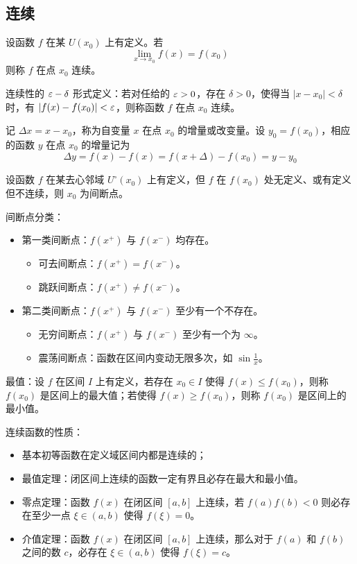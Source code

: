 \subsection{连续}

\begin{definition}[连续性]
	设函数 $f$ 在某 $U(x_0)$ 上有定义。若
	\[ \lim_{x\to x_0}f(x) = f(x_0) \]
	则称 $f$ 在点 $x_0$ 连续。

	连续性的 $\varepsilon-\delta$ 形式定义：若对任给的 $\varepsilon>0$，存在 $\delta>0$，使得当 $|x-x_0|<\delta$ 时，有 $|f(x)-f(x_0)|<\varepsilon$，则称函数 $f$ 在点 $x_0$ 连续。
\end{definition}

记 $\Delta x = x-x_0$，称为自变量 $x$ 在点 $x_0$ 的增量或改变量。设 $y_0=f(x_0)$，相应的函数 $y$ 在点 $x_0$ 的增量记为
\[ \Delta y = f(x)-f(x) = f(x+\Delta)-f(x_0) = y-y_0 \]



\begin{definition}[间断点]
	设函数 $f$ 在某去心邻域 $U^\circ(x_0)$ 上有定义，但 $f$ 在 $f(x_0)$ 处无定义、或有定义但不连续，则 $x_0$ 为间断点。
\end{definition}

间断点分类：

\begin{itemize}
	\item 第一类间断点：$f(x^+)$ 与 $f(x^-)$ 均存在。
	      \begin{itemize}
		      \item 可去间断点：$f(x^+) = f(x^-)$。
		      \item 跳跃间断点：$f(x^+) \neq f(x^-)$。
	      \end{itemize}
	\item 第二类间断点：$f(x^+)$ 与 $f(x^-)$ 至少有一个不存在。
	      \begin{itemize}
		      \item 无穷间断点：$f(x^+)$ 与 $f(x^-)$ 至少有一个为 $\infty$。
		      \item 震荡间断点：函数在区间内变动无限多次，如 $\sin \frac{1}{x}$。
	      \end{itemize}
\end{itemize}


最值：设 $f$ 在区间 $I$ 上有定义，若存在 $x_0 \in I$ 使得 $f(x) \leqslant f(x_0)$，则称 $f(x_0)$ 是区间上的最大值；若使得 $f(x) \geqslant f(x_0)$，则称 $f(x_0)$ 是区间上的最小值。

连续函数的性质：

\begin{itemize}
	\item 基本初等函数在定义域区间内都是连续的；
	\item 最值定理：闭区间上连续的函数一定有界且必存在最大和最小值。
	\item 零点定理：函数 $f(x)$ 在闭区间 $[a, b]$ 上连续，若 $f(a)f(b) < 0$ 则必存在至少一点 $\xi \in (a, b)$ 使得 $f(\xi) = 0$。
	\item 介值定理：函数 $f(x)$ 在闭区间 $[a, b]$ 上连续，那么对于 $f(a)$ 和 $f(b)$ 之间的数 $c$，必存在 $\xi \in (a, b)$ 使得 $f(\xi) = c$。
\end{itemize}

